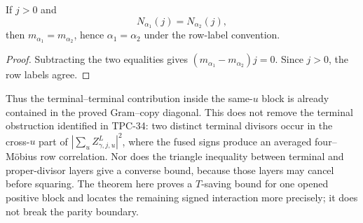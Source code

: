 \begin{proposition}
\label{prop:tpc35-terminal-equality}
If \(j>0\) and
\begin{equation}
 N_{\alpha_1}(j)=N_{\alpha_2}(j),
 \label{eq:tpc35-terminal-equality}
\end{equation}
then \(m_{\alpha_1}=m_{\alpha_2}\), hence
\(\alpha_1=\alpha_2\) under the row-label convention.
\end{proposition}

\begin{proof}
Subtracting the two equalities gives
\((m_{\alpha_1}-m_{\alpha_2})j=0\).  Since \(j>0\), the row labels agree.
\end{proof}

Thus the terminal--terminal contribution inside the same-\(u\) block is
already contained in the proved Gram--copy diagonal.  This does not remove
the terminal obstruction identified in TPC-34: two distinct terminal
divisors occur in the cross-\(u\) part of
\(
 |\sum_uZ_{\gamma,j,u}^L|^2
\), where the fused signs produce an averaged four--M\"obius row
correlation.  Nor does the triangle inequality between terminal and
proper-divisor layers give a converse bound, because those layers may
cancel before squaring.  The theorem here proves a \(T\)-saving bound for
one opened positive block and locates the remaining signed interaction
more precisely; it does not break the parity boundary.
